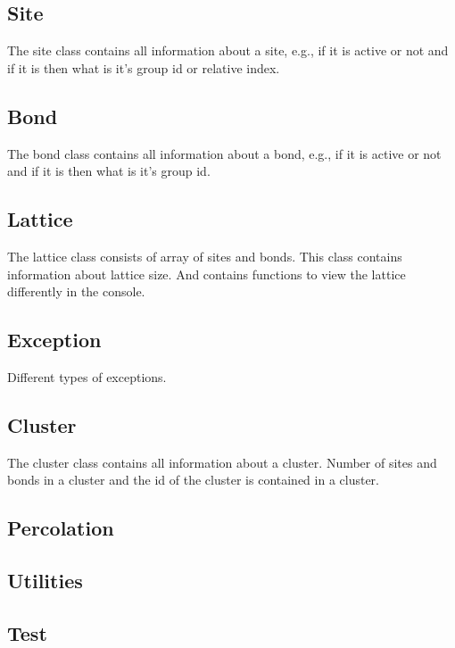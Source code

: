 	
	\subsection{Site}
	The site class contains all information about a site, e.g., if it is active or not and if it is then what is it's group id or relative index.
	
	
	\subsection{Bond}
	The bond class contains all information about a bond, e.g., if it is active or not and if it is then what is it's group id.
	
			
	\subsection{Lattice}
	The lattice class consists of array of sites and bonds. This class contains information about lattice size. And contains functions to view the lattice differently in the console.
	
	
	\subsection{Exception}
	Different types of exceptions.
	
	
	\subsection{Cluster}
	The cluster class contains all information about a cluster. Number of sites and bonds in a cluster and the id of the cluster is contained in a cluster.
	
	
	\subsection{Percolation}
	
	
	
	\subsection{Utilities}
	
	
	
	
	\subsection{Test}
	
	
